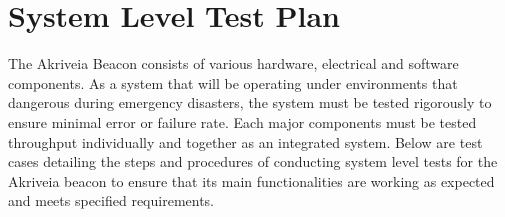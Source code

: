 

\setcounter{section}{1}
\section{System Level Test Plan}
\bigskip

The Akriveia Beacon consists of various hardware, electrical and software components. As a system that will be operating under environments that dangerous during emergency disasters, the system must be tested  rigorously to ensure minimal error or failure rate. Each major components must be tested throughput individually and together as an integrated system. Below are test cases detailing the steps and procedures of conducting system level tests for the Akriveia beacon to ensure that its main functionalities are working as expected and meets specified requirements. 

